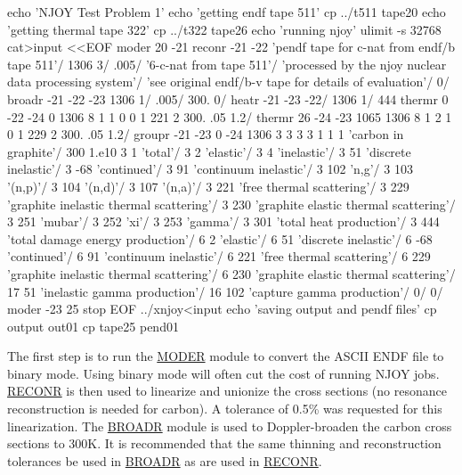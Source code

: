 \small
\begin{ccode}

echo 'NJOY Test Problem 1'
echo 'getting endf tape 511'
cp ../t511 tape20
echo 'getting thermal tape 322'
cp ../t322 tape26
echo 'running njoy'
ulimit -s 32768
cat>input <<EOF
 moder
 20 -21
 reconr
 -21 -22
 'pendf tape for c-nat from endf/b tape 511'/
 1306 3/
 .005/
 '6-c-nat from tape 511'/
 'processed by the njoy nuclear data processing system'/
 'see original endf/b-v tape for details of evaluation'/
 0/
 broadr
 -21 -22 -23
 1306 1/
 .005/
 300.
 0/
 heatr
 -21 -23 -22/
 1306 1/
 444
 thermr
 0 -22 -24
 0 1306 8 1 1 0 0 1 221 2
 300.
 .05 1.2/
 thermr
 26 -24 -23
 1065 1306 8 1 2 1 0 1 229 2
 300.
 .05 1.2/
 groupr
 -21 -23 0 -24
 1306 3 3 3 3 1 1 1
 'carbon in graphite'/
 300
 1.e10
 3 1 'total'/
 3 2 'elastic'/
 3 4 'inelastic'/
 3 51 'discrete inelastic'/
 3 -68 'continued'/
 3 91 'continuum inelastic'/
 3 102 'n,g'/
 3 103 '(n,p)'/
 3 104 '(n,d)'/
 3 107 '(n,a)'/
 3 221 'free thermal scattering'/
 3 229 'graphite inelastic thermal scattering'/
 3 230 'graphite elastic thermal scattering'/
 3 251 'mubar'/
 3 252 'xi'/
 3 253 'gamma'/
 3 301 'total heat production'/
 3 444 'total damage energy production'/
 6 2 'elastic'/
 6 51 'discrete inelastic'/
 6 -68 'continued'/
 6 91 'continuum inelastic'/
 6 221 'free thermal scattering'/
 6 229 'graphite inelastic thermal scattering'/
 6 230 'graphite elastic thermal scattering'/
 17 51 'inelastic gamma production'/
 16 102 'capture gamma production'/
 0/
 0/
 moder
 -23 25
 stop
EOF
../xnjoy<input
echo 'saving output and pendf files'
cp output out01
cp tape25 pend01

\end{ccode}
\normalsize

The first step is to run the \hyperlink{sMODERhy}{MODER}
module to convert the ASCII ENDF file to binary mode.  Using
binary mode will often cut the cost of running NJOY
jobs.  \hyperlink{sRECONRhy}{RECONR} is then used to linearize and
unionize the cross sections (no resonance reconstruction is
needed for carbon).  A tolerance of 0.5\% was requested for this
linearization.  The \hyperlink{sBROADRhy}{BROADR} module
is used to Doppler-broaden the carbon cross sections to
300K.  It is recommended that the same thinning and
reconstruction tolerances be used in
\hyperlink{sBROADRhy}{BROADR} as are used in
\hyperlink{sRECONRhy}{RECONR}.

